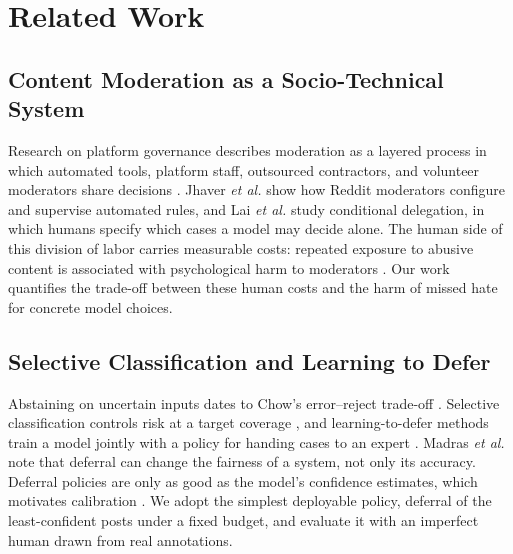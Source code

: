 \documentclass[lettersize,journal]{IEEEtran}
\begin{document}
\section{Related Work}
\subsection{Content Moderation as a Socio-Technical System}
Research on platform governance describes moderation as a layered process in which automated tools, platform staff, outsourced contractors, and volunteer moderators share decisions \cite{gillespie2018custodians,gorwa2020algorithmic}. Jhaver \textit{et al.} \cite{jhaver2019human} show how Reddit moderators configure and supervise automated rules, and Lai \textit{et al.} \cite{lai2022human} study conditional delegation, in which humans specify which cases a model may decide alone. The human side of this division of labor carries measurable costs: repeated exposure to abusive content is associated with psychological harm to moderators \cite{roberts2019behind,steiger2021psychological}. Our work quantifies the trade-off between these human costs and the harm of missed hate for concrete model choices.

\subsection{Selective Classification and Learning to Defer}
Abstaining on uncertain inputs dates to Chow's error--reject trade-off \cite{chow1970optimum}. Selective classification controls risk at a target coverage \cite{geifman2017selective}, and learning-to-defer methods train a model jointly with a policy for handing cases to an expert \cite{madras2018predict,mozannar2020consistent}. Madras \textit{et al.} \cite{madras2018predict} note that deferral can change the fairness of a system, not only its accuracy. Deferral policies are only as good as the model's confidence estimates, which motivates calibration \cite{guo2017calibration}. We adopt the simplest deployable policy, deferral of the least-confident posts under a fixed budget, and evaluate it with an imperfect human drawn from real annotations.
\end{document}
